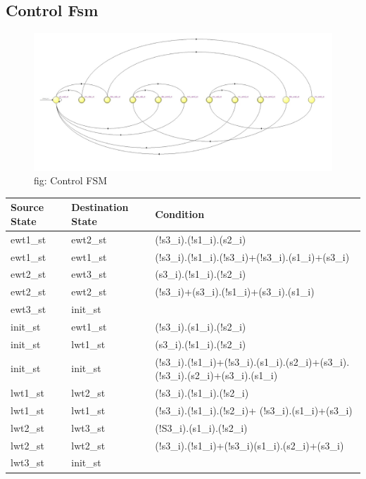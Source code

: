\documentclass[12pt,a4 paper] {report}
\begin{document}
\subsection{Control Fsm}
\begin{figure}[h]
	\centering	
	\includegraphics[scale=0.3]{../png/Control.png}
	\newline
	fig: Control FSM\\
\end{figure}

\begin{center}
	\begin{tabular}{| p{2cm} | p{2cm} | p{11cm} |}
		\hline
		Source State& Destination State & Condition \\
		\hline
		ewt1\_st & ewt2\_st & (!s3\_i).(!s1\_i).(s2\_i) \\
		\hline
		ewt1\_st & ewt1\_st  & (!s3\_i).(!s1\_i).(!s3\_i)+(!s3\_i).(s1\_i)+(s3\_i) \\
		\hline
		ewt2\_st & ewt3\_st & (s3\_i).(!s1\_i).(!s2\_i)\\
		\hline
		ewt2\_st & ewt2\_st & (!s3\_i)+(s3\_i).(!s1\_i)+(s3\_i).(s1\_i)\\
		\hline
		ewt3\_st & init\_st & \\
		\hline
		init\_st & ewt1\_st & (!s3\_i).(s1\_i).(!s2\_i)\\
		\hline
		init\_st & lwt1\_st & (s3\_i).(!s1\_i).(!s2\_i)\\
		\hline
		init\_st & init\_st & (!s3\_i).(!s1\_i)+(!s3\_i).(s1\_i).(s2\_i)+(s3\_i).(!s3\_i).(s2\_i)+(s3\_i).(s1\_i)\\
		\hline	
		lwt1\_st & lwt2\_st & (!s3\_i).(!s1\_i).(!s2\_i)\\
		\hline	
		lwt1\_st & lwt1\_st & (!s3\_i).(!s1\_i).(!s2\_i)+ (!s3\_i).(s1\_i)+(s3\_i)\\
		\hline
		lwt2\_st & lwt3\_st & (!S3\_i).(s1\_i).(!s2\_i) \\
		\hline
		lwt2\_st & lwt2\_st & (!s3\_i).(!s1\_i)+(!s3\_i)(s1\_i).(s2\_i)+(s3\_i) \\
		\hline
		lwt3\_st & init\_st  & \\
		\hline	
	\end{tabular}
\end{center}
\end{document}
